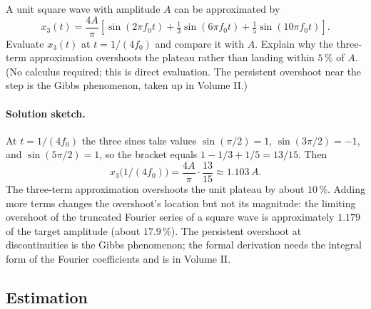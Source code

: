 \begin{exercise}
A unit square wave with amplitude $A$ can be approximated by
\[
x_{3}(t)=\frac{4A}{\pi}\left[\sin(2\pi f_{0} t)+\tfrac{1}{3}\sin(6\pi f_{0} t)+\tfrac{1}{5}\sin(10\pi f_{0} t)\right].
\]
Evaluate $x_{3}(t)$ at $t = 1/(4 f_{0})$ and compare it with $A$.
Explain why the three-term approximation overshoots the plateau
rather than landing within $5\,\%$ of $A$. (No calculus required;
this is direct evaluation. The persistent overshoot near the step
is the Gibbs phenomenon, taken up in Volume II.)

\paragraph{Solution sketch.}
At $t = 1/(4 f_{0})$ the three sines take values
$\sin(\pi/2) = 1$, $\sin(3\pi/2) = -1$, and $\sin(5\pi/2) = 1$,
so the bracket equals $1 - 1/3 + 1/5 = 13/15$. Then
\[
x_{3}\bigl(1/(4 f_{0})\bigr) = \frac{4A}{\pi} \cdot \frac{13}{15}
   \approx 1.103 \,A.
\]
The three-term approximation overshoots the unit plateau by about
$10\,\%$. Adding more terms changes the overshoot's location but
not its magnitude: the limiting overshoot of the truncated
Fourier series of a square wave is approximately $1.179$ of the
target amplitude (about $17.9\,\%$). The persistent overshoot at
discontinuities is the Gibbs phenomenon; the formal derivation
needs the integral form of the Fourier coefficients and is in
Volume II.
\end{exercise}

\subsection*{Estimation}

